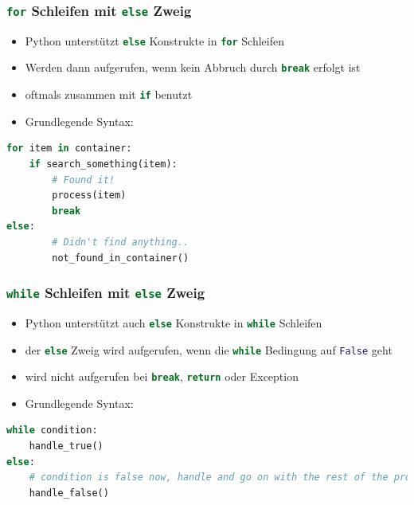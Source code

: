\documentclass[ngerman]{beamer}
\begin{document}
\begin{frame}[containsverbatim]
\frametitle{\lstinline[language={Python}]{for}  Schleifen mit \lstinline[language={Python}]{else}  Zweig}

\begin{itemize}
\item Python unterstützt \lstinline[language={Python}]{else}  Konstrukte in \lstinline[language={Python}]{for}  Schleifen
\item Werden dann aufgerufen, wenn kein Abbruch durch \lstinline[language={Python}]{break}  erfolgt ist
\item oftmals zusammen mit \lstinline[language={Python}]{if}  benutzt
\item Grundlegende Syntax:\vspace*{0em}
\end{itemize}

\begin{lstlisting}[language={Python}]
for item in container:
    if search_something(item):
        # Found it!
        process(item)
        break
else:
        # Didn't find anything..
        not_found_in_container()
\end{lstlisting} %

\end{frame}


\begin{frame}[containsverbatim]
\frametitle{\lstinline[language={Python}]{while}  Schleifen mit \lstinline[language={Python}]{else}  Zweig}

\begin{itemize}
\item Python unterstützt auch \lstinline[language={Python}]{else}  Konstrukte in \lstinline[language={Python}]{while}  Schleifen
\item der \lstinline[language={Python}]{else}  Zweig wird aufgerufen, wenn die \lstinline[language={Python}]{while}  Bedingung auf \lstinline[language={Python}]{False}  geht
\item wird nicht aufgerufen bei \lstinline[language={Python}]{break}, \lstinline[language={Python}]{return} oder Exception
\item Grundlegende Syntax:\vspace*{0em}
\end{itemize}

\begin{lstlisting}[language={Python}]
while condition:
    handle_true()
else:
    # condition is false now, handle and go on with the rest of the program
    handle_false()
\end{lstlisting}



\end{frame}
\end{document}
